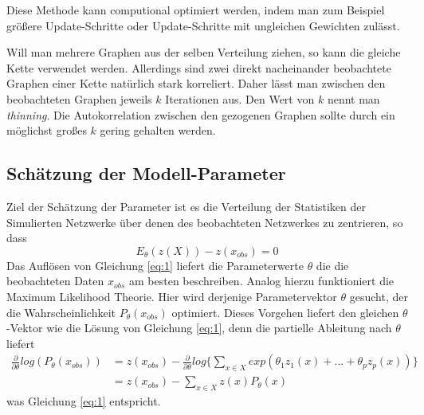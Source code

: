 \documentclass[a4paper,ngerman,oneside,titlepage,bibliography=totoc,11pt]{scrreprt}
\begin{document}
Diese Methode kann computional optimiert werden, indem man zum Beispiel größere Update-Schritte oder Update-Schritte mit ungleichen Gewichten zulässt.

Will man mehrere Graphen aus der selben Verteilung ziehen, so kann die gleiche Kette verwendet werden. Allerdings sind zwei direkt nacheinander beobachtete Graphen einer Kette natürlich stark korreliert. Daher lässt man zwischen den beobachteten Graphen jeweils $k$ Iterationen aus. Den Wert von $k$ nennt man \emph{thinning}. Die Autokorrelation zwischen den gezogenen Graphen sollte durch ein möglichst großes $k$ gering gehalten werden.

\subsection{Schätzung der Modell-Parameter}
\label{sec:modpar}
Ziel der Schätzung der Parameter ist es die Verteilung der Statistiken der Simulierten Netzwerke über denen des beobachteten Netzwerkes zu zentrieren, so dass
\begin{equation}
	E_\theta(z(X)) - z(x_{obs}) = 0
	\label{eq:1}
\end{equation}
Das Auflösen von Gleichung \ref{eq:1} liefert die Parameterwerte $\theta$ die die beobachteten Daten $x_{obs}$ am besten beschreiben.
Analog hierzu funktioniert die Maximum Likelihood Theorie. Hier wird derjenige Parametervektor $\theta$ gesucht, der die Wahrscheinlichkeit $P_\theta(x_{obs})$ optimiert. Dieses Vorgehen liefert den gleichen $\theta$-Vektor wie die Lösung von Gleichung \ref{eq:1}, denn die partielle Ableitung nach $\theta$ liefert
\begin{align*}
\frac{\partial}{\partial \theta} log(P_\theta(x_{obs})) &= z(x_{obs}) - \frac{\partial}{\partial \theta} log\{\sum_{x \in X}{exp(\theta_1z_1(x)+ ... + \theta_pz_p(x))}\}\\
&=z(x_{obs}) - \sum_{x \in X}{z(x)P_\theta(x)}
\end{align*}
was Gleichung \ref{eq:1} entspricht. 
\end{document}
